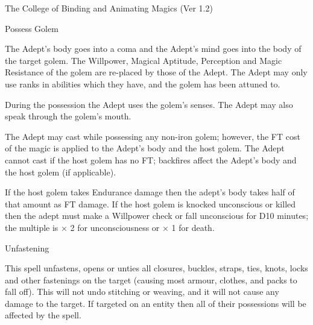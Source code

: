 \begin{Chapter}{The College of Binding and Animating Magics (Ver 1.2)}
\begin{spell}[S-10]{Possess Golem }

\begin{effects}
The Adept’s body goes into a coma and the Adept’s mind goes into the
body of the target golem.  The Willpower, Magical Aptitude, Perception
and Magic Resistance of the golem are re-placed by those of the
Adept. The Adept may only use ranks in abilities which they have, and
the golem has been attuned to.

During the possession the Adept uses the golem’s senses.  The Adept
may also speak through the golem’s mouth.

The Adept may cast while possessing any non-iron golem; however, the
FT cost of the magic is applied to the Adept’s body and the host
golem. The Adept cannot cast if the host golem has no FT; backfires
affect the Adept’s body and the host golem (if applicable).

If the host golem takes Endurance damage then the adept’s body takes
half of that amount as FT damage.  If the host golem is knocked
unconscious or killed then the adept must make a Willpower check or
fall unconscious for D10 minutes; the multiple is × 2 for
unconsciousness or × 1 for death.
\end{effects}
\end{spell}

\begin{spell}[S-11]{Unfastening}
\begin{effects}
This spell unfastens, opens or unties all closures, buckles, straps,
ties, knots, locks and other fastenings on the target (causing most
armour, clothes, and packs to fall off). This will not undo stitching
or weaving, and it will not cause any damage to the target.  If
targeted on an entity then all of their possessions will be affected
by the spell.
\end{effects}
\end{spell}


\end{Chapter}
